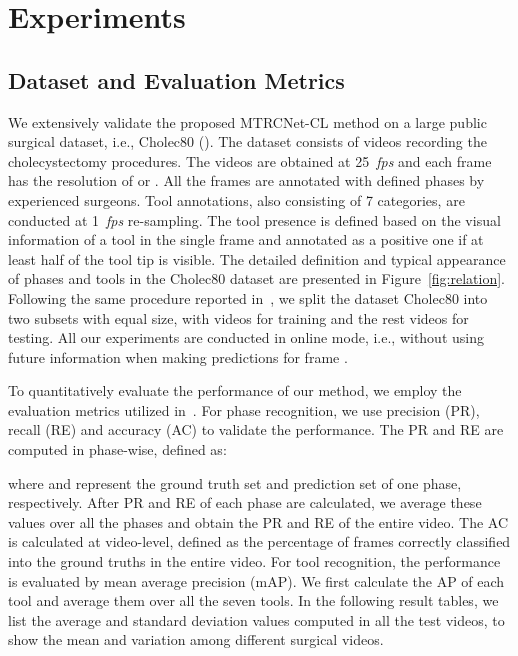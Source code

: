 \documentclass{elsarticle}
\begin{document}
\section{Experiments}
\subsection{Dataset and Evaluation Metrics}
We extensively validate the proposed MTRCNet-CL method on a large public surgical dataset, i.e., Cholec80 (\cite{Cholec}).
The dataset consists of  videos recording the cholecystectomy procedures.
The videos are obtained at 25~\emph{fps} and each frame has the resolution of  or .
All the frames are annotated with  defined phases by experienced surgeons.
Tool annotations, also consisting of 7 categories, are conducted at 1~\emph{fps} re-sampling.
The tool presence is defined based on the visual information of a tool in the single frame and annotated as a positive one if at least half of the tool tip is visible.
The detailed definition and typical appearance of phases and tools in the Cholec80 dataset are presented in Figure~\ref{fig:relation}.
Following the same procedure reported in~\cite{twinanda2017endonet}, we split the dataset Cholec80 into two subsets with equal size, with  videos for training and the rest  videos for testing.
All our experiments are conducted in online mode, i.e., without using future information  when making predictions for frame .


To quantitatively evaluate the performance of our method, we employ the evaluation metrics utilized in~\cite{twinanda2017endonet}.
For phase recognition, we use precision (PR), recall (RE) and accuracy (AC) to validate the performance.
The PR and RE are computed in phase-wise, defined as:

where  and  represent the ground truth set and prediction set of one phase, respectively.
After PR and RE of each phase are calculated, we average these values over all the phases and obtain the PR and RE of the entire video.
The AC is calculated at video-level, defined as the percentage of frames correctly classified into the ground truths in the entire video.
For tool recognition, the performance is evaluated by mean average precision (mAP).
We first calculate the AP of each tool and average them over all the seven tools.
In the following result tables, we list the average and standard deviation values computed in all the test videos, to show the mean and variation among different surgical videos.
\end{document}
